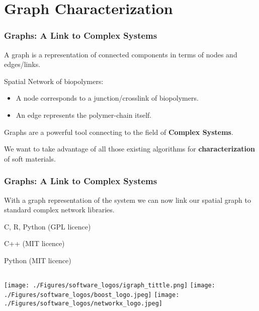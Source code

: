 \documentclass[9pt]{beamer}
\begin{document}
\section{Graph Characterization}
\begin{frame}
  \frametitle{Graphs: A Link to Complex Systems}
  A graph is a representation of connected components in terms of nodes and edges/links.

  \begin{exampleblock}{Spatial Network of biopolymers:}
    \begin{itemize}
      \item A node corresponds to a junction/crosslink of biopolymers.
      \item An edge represents the polymer-chain itself.
    \end{itemize}
  \end{exampleblock}

  Graphs are a powerful tool connecting to the field of \textbf{Complex Systems}.

  We want to take advantage of all those existing algorithms for \textbf{characterization} of soft materials.

\end{frame}
\begin{frame}
  \frametitle{Graphs: A Link to Complex Systems}
  With a graph representation of the system we can now link our spatial graph to standard complex network libraries.
  \begin{description}[t]
      \item[IGraph] C, R, Python (GPL licence)
      \item[Boost: Graph and GraphParallel] C++ (MIT licence)
      \item[NetworkX] Python (MIT licence)
  \end{description}

  \vspace{1cm}
  \begin{columns}[onlytextwidth]
      \texttt{[image: ./Figures/software\_logos/igraph\_tittle.png]}
      \texttt{[image: ./Figures/software\_logos/boost\_logo.jpeg]}
      \texttt{[image: ./Figures/software\_logos/networkx\_logo.jpeg]}
  \end{columns}

\end{frame}
\end{document}
